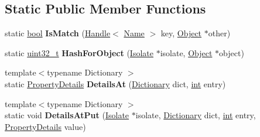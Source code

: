 \subsection*{Static Public Member Functions}
\begin{DoxyCompactItemize}
\item 
\mbox{\label{classv8_1_1internal_1_1GlobalDictionaryShape_ac57cd1a6a58495782fc1d78cd6ab2c00}} 
static \mbox{\hyperlink{classbool}{bool}} {\bfseries Is\+Match} (\mbox{\hyperlink{classv8_1_1internal_1_1Handle}{Handle}}$<$ \mbox{\hyperlink{classv8_1_1internal_1_1Name}{Name}} $>$ key, \mbox{\hyperlink{classv8_1_1internal_1_1Object}{Object}} $\ast$other)
\item 
\mbox{\label{classv8_1_1internal_1_1GlobalDictionaryShape_a5043db2e3e4eee7f9cf375634260b3f9}} 
static \mbox{\hyperlink{classuint32__t}{uint32\+\_\+t}} {\bfseries Hash\+For\+Object} (\mbox{\hyperlink{classv8_1_1internal_1_1Isolate}{Isolate}} $\ast$isolate, \mbox{\hyperlink{classv8_1_1internal_1_1Object}{Object}} $\ast$object)
\item 
\mbox{\label{classv8_1_1internal_1_1GlobalDictionaryShape_af9914ae82bb735ea8e15b7f0f55543eb}} 
{\footnotesize template$<$typename Dictionary $>$ }\\static \mbox{\hyperlink{classv8_1_1internal_1_1PropertyDetails}{Property\+Details}} {\bfseries Details\+At} (\mbox{\hyperlink{classv8_1_1internal_1_1Dictionary}{Dictionary}} dict, \mbox{\hyperlink{classint}{int}} entry)
\item 
\mbox{\label{classv8_1_1internal_1_1GlobalDictionaryShape_aa1796ed7548ec328cf9b2c7a86f7a3fc}} 
{\footnotesize template$<$typename Dictionary $>$ }\\static void {\bfseries Details\+At\+Put} (\mbox{\hyperlink{classv8_1_1internal_1_1Isolate}{Isolate}} $\ast$isolate, \mbox{\hyperlink{classv8_1_1internal_1_1Dictionary}{Dictionary}} dict, \mbox{\hyperlink{classint}{int}} entry, \mbox{\hyperlink{classv8_1_1internal_1_1PropertyDetails}{Property\+Details}} value)
\item 
\mbox{\label{classv8_1_1internal_1_1GlobalDictionaryShape_a8c62c71fde0c00b69bbcd85ed0383311}} 

\end{DoxyCompactItemize}
